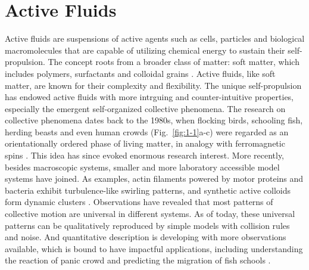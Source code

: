 \section{Active Fluids}
\label{active-fluids}
Active fluids are suspensions of active agents such as cells, particles and biological macromolecules that are capable of utilizing chemical energy to sustain their self-propulsion. The concept roots from a broader class of matter: soft matter, which includes polymers, surfactants and colloidal grains \cite{DeGennes1992}. Active fluids, like soft matter, are known for their complexity and flexibility. The unique self-propulsion has endowed active fluids with more intrguing and counter-intuitive properties, especially the emergent self-organized collective phenomena\cite{Glotzer2015}. The research on collective phenomena dates back to the 1980s, when flocking birds, schooling fish, herding beasts and even human crowds (Fig.~\ref{fig:1-1}a-c) were regarded as an orientationally ordered phase of living matter, in analogy with ferromagnetic spins
\cite{Reynolds1987, Vicsek1995, Narayan2007, Ward2008, Ballerini2008, Silverberg2013}. This idea has since evoked enormous research interest. More recently, besides macroscopic systems, smaller and more laboratory accessible model systems have joined. As examples, actin filaments powered by motor proteins and bacteria exhibit turbulence-like swirling patterns, and synthetic active colloids form dynamic clusters
\cite{Dunkel2013, Wensink2012, Buttinoni2013, Palacci2013, Sanchez2012, Schaller2010, Sokolov2007}. Observations have revealed that most patterns of collective motion are universal in different systems. As of today, these universal patterns can be qualitatively reproduced by simple models with collision rules and noise. And quantitative description is developing with more observations available, which is bound to have impactful applications, including understanding the reaction of panic crowd and predicting the migration of fish schools
\cite{Vicsek2012}.

